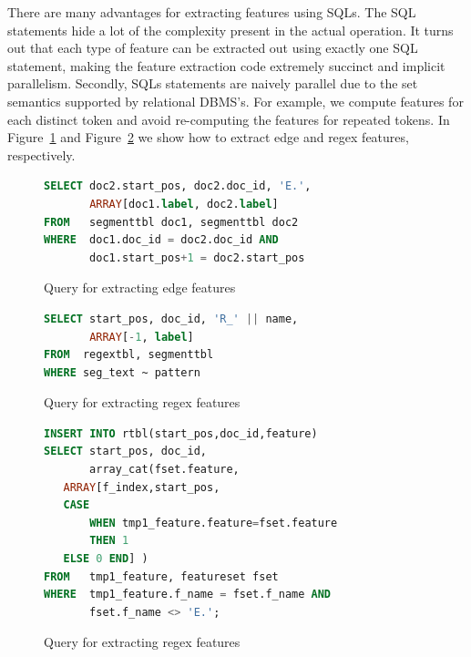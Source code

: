 \documentclass[11pt,letterpaper]{article}
\begin{document}
There are many advantages for extracting features using SQLs.  
The SQL statements hide a lot of the complexity  present  in the actual operation.
It turns out that each type of feature can be extracted out using exactly one SQL statement, 
making the feature extraction code extremely succinct and implicit parallelism.  
Secondly, SQLs statements are naively parallel due to the set semantics supported by relational DBMS's.
For example, we compute features for each distinct token and avoid re-computing the features for repeated tokens.  
In Figure~\ref{fig:edgefeatures} and Figure~\ref{fig:regexfeatures} we show how to extract edge
and regex features, respectively.

\begin{figure}
\centering
\begin{lstlisting}[language=SQL,breaklines=true]
SELECT doc2.start_pos, doc2.doc_id, 'E.', 
       ARRAY[doc1.label, doc2.label]
FROM   segmenttbl doc1, segmenttbl doc2
WHERE  doc1.doc_id = doc2.doc_id AND 
       doc1.start_pos+1 = doc2.start_pos
\end{lstlisting}
\caption{Query for extracting edge features}
\label{fig:edgefeatures}
\end{figure}

\begin{figure}
\centering
\begin{lstlisting}[language=SQL, breaklines=true]
SELECT start_pos, doc_id, 'R_' || name, 
       ARRAY[-1, label]
FROM  regextbl, segmenttbl
WHERE seg_text ~ pattern
\end{lstlisting}
\caption{Query for extracting regex features}
\label{fig:regexfeatures}
\end{figure}


\begin{figure}
\centering
\begin{lstlisting}[language=SQL,breaklines=true]
INSERT INTO rtbl(start_pos,doc_id,feature)
SELECT start_pos, doc_id, 
       array_cat(fset.feature, 
   ARRAY[f_index,start_pos, 
   CASE 
       WHEN tmp1_feature.feature=fset.feature 
       THEN 1
   ELSE 0 END] )
FROM   tmp1_feature, featureset fset
WHERE  tmp1_feature.f_name = fset.f_name AND 
       fset.f_name <> 'E.';
\end{lstlisting}
\caption{Query for extracting regex features}
\end{figure}
\end{document}
